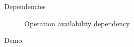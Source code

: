 



\begin{frame}{Dependencies}
  \begin{figure}
    \centering
    
    \caption{Operation availability dependency}
    \label{fig:operation-dependence}
  \end{figure}
\end{frame}

%     


\begin{frame}[standout]
  Demo
\end{frame}